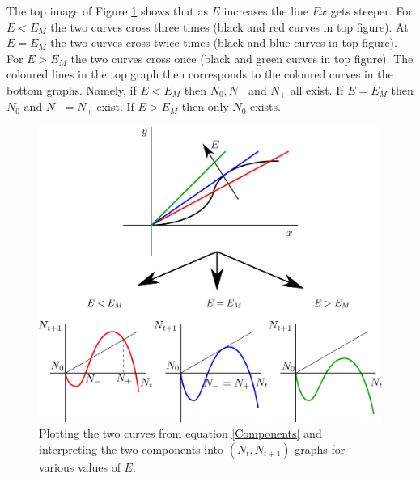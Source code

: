 \documentclass[10pt]{article}
\newcommand{\fig}[1]{Figure \ref{#1}}
\newcommand{\eqn}[1]{equation \eqref{#1}}
\newcommand{\tp}{.8\textwidth}
\begin{document}
\begin{Answ}
\begin{enumerate}
The top image of \fig{Discrete_dynamics} shows that as $E$ increases the line $Ex$ gets steeper. For $E<E_M$ the two curves cross three times (black and red curves in top figure). At $E=E_M$ the two curves cross twice times (black and blue curves in top figure). For $E>E_M$ the two curves cross once (black and green curves in top figure). The coloured lines in the top graph then corresponds to the coloured curves in the bottom graphs. Namely, if $E<E_M$ then $N_0, N_-$ and $N_+$ all exist. If $E=E_M$ then $N_0$ and $N_-=N_+$ exist. If $E>E_M$ then only $N_0$ exists.
\begin{figure}[h!!!tb]
\centering
\includegraphics[width=\tp]{../../Pictures/Discrete_dynamics.png}
\caption{\label{Discrete_dynamics} Plotting the two curves from \eqn{Components} and interpreting the two components into $(N_t,N_{t+1})$ graphs for various values of $E$. }
\end{figure}




\end{enumerate}
\end{Answ}
\end{document}
